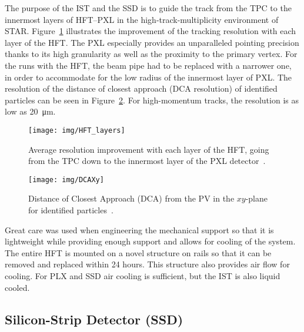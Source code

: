 The purpose of the IST and the SSD is to guide the track from the TPC to the innermost layers of HFT--PXL in the high-track-multiplicity environment of STAR. Figure~\ref{HFT_layers} illustrates the improvement of the tracking resolution with each layer of the HFT\@. The PXL especially provides an unparalleled pointing precision thanks to its high granularity as well as the proximity to the primary vertex. For the runs with the HFT, the beam pipe had to be replaced with a narrower one, in order to accommodate for the low radius of the innermost layer of PXL\@. The resolution of the distance of closest approach (DCA resolution) of identified particles can be seen in Figure~\ref{DCA}. For high-momentum tracks, the resolution is as low as \SI{20}{\micro\metre}.

\begin{figure}[!htb]
\begin{center}
 \texttt{[image: img/HFT\_layers]}\\
\end{center}
\caption[Average resolution improvement with each layer of the HFT.]{\label{HFT_layers}Average resolution improvement with each layer of the HFT, going from the TPC down to the innermost layer of the PXL detector~\cite{KubaVyzkumak}.}
\end{figure}

\begin{figure}[!htb]
\begin{center}
 \texttt{[image: img/DCAXy]}\\
\end{center}
\caption[DCA from the PV in the $xy$-plane for identified particles.]{\label{DCA}Distance of Closest Approach (DCA) from the PV in the $xy$-plane for identified particles~\cite{D0v2paper}.}
\end{figure}


Great care was used when engineering the mechanical support so that it is lightweight while providing enough support and allows for cooling of the system. The entire HFT is mounted on a novel structure on rails so that it can be removed and replaced within 24 hours. This structure also provides air flow for cooling. For PLX and SSD  air cooling is sufficient, but the IST is also liquid cooled.

\subsection{Silicon-Strip Detector (SSD)}

